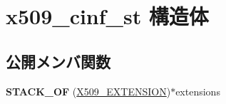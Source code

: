 \hypertarget{structx509__cinf__st}{}\section{x509\+\_\+cinf\+\_\+st 構造体}
\label{structx509__cinf__st}
\subsection*{公開メンバ関数}
\begin{DoxyCompactItemize}
\item 
\hypertarget{structx509__cinf__st_a5b2aaa2ad972a8207194b43c4c043032}{}{\bfseries S\+T\+A\+C\+K\+\_\+\+O\+F} (\hyperlink{struct_x509__extension__st}{X509\+\_\+\+E\+X\+T\+E\+N\+S\+I\+O\+N})$\ast$extensions\label{structx509__cinf__st_a5b2aaa2ad972a8207194b43c4c043032}

\end{DoxyCompactItemize}
